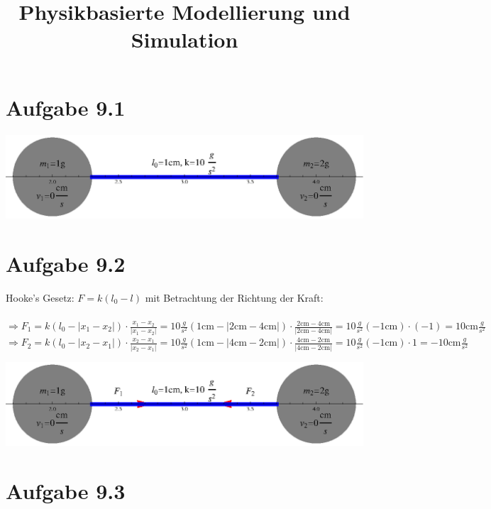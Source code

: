 \documentclass[DIV12]{scrartcl}
\title{Physikbasierte Modellierung und Simulation}
\author{}
\date{}
\begin{document}
\maketitle

\section*{Aufgabe 9.1}

\includegraphics{ex09_gr1.eps}


\section*{Aufgabe 9.2}

Hooke{'}s Gesetz: \(F=k\left(l_0-l\right)\) mit Betrachtung der Richtung der Kraft:
\\\\
\(\Rightarrow  F_1=k(l_0-| x_1-x_2| )\cdot\frac{x_1-x_2}{| x_1-x_2| }=10\frac{g}{s^2}(1\text{cm}-|
2\text{cm}-4\text{cm}| )\cdot\frac{2\text{cm}-4\text{cm}}{| 2\text{cm}-4\text{cm}| }=10\frac{g}{s^2}(-1\text{cm})\cdot(-1)=10\text{cm} \frac{g}{s^2}\)\\
\(\Rightarrow  F_2=k(l_0-| x_2-x_1| )\cdot\frac{x_2-x_1}{| x_2-x_1| }=10\frac{g}{s^2}(1\text{cm}-|
4\text{cm}-2\text{cm}| )\cdot\frac{4\text{cm}-2\text{cm}}{| 4\text{cm}-2\text{cm}| }=10\frac{g}{s^2}(-1\text{cm})\cdot1=-10\text{cm} \frac{g}{s^2}\)

\includegraphics{ex09_gr2.eps}

\section*{Aufgabe 9.3}
\end{document}
